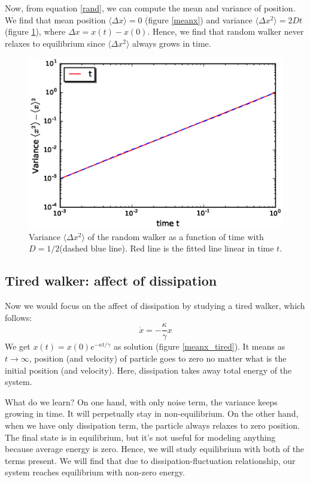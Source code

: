 \documentclass[11pt,a4paper]{article}
\begin{document}
Now, from equation \ref{rand}, we can compute the mean and variance of position. We find that mean position $\langle \Delta x\rangle=0$ (figure \ref{meanx}) and variance $\langle \Delta x ^2\rangle=2 Dt$ (figure \ref{varx}), where $\Delta x= x(t)-x(0)$. Hence, we find that random walker never relaxes to equilibrium since  $\langle \Delta x ^2\rangle$ always grows in time. 




\begin{figure}[!htbp]
\centering
\includegraphics[scale=0.67]{x_var.eps}
\caption{ Variance $\langle \Delta x ^2\rangle$ of the random walker as a function of time with $D=1/2$(dashed blue line).  Red line is the fitted line linear in time $t$.  }
\label{varx}
\end{figure}




\subsection*{Tired walker: affect of dissipation}
Now we would focus on the affect of dissipation by studying a tired walker, which follows:
\begin{equation}
\dot{x}= - \frac{\kappa}{\gamma} x 
\end{equation}
We get $x(t)=x(0) e^{-\kappa t/\gamma}$ as solution (figure \ref{meanx_tired}). It means as $t\rightarrow \infty$, position  (and velocity) of particle goes to zero no matter what is the initial position (and velocity). Here, dissipation takes away total energy of the system. 

What do we learn? On one hand, with only noise term, the variance keeps growing in time. It will perpetually stay in non-equilibrium. On the other hand, when we have only dissipation term, the particle always relaxes to zero position. The final state is in equilibrium, but it's not useful for modeling anything because average energy is zero. Hence, we will study equilibrium with both of the terms present. We will find that due to dissipation-fluctuation relationship, our system reaches equilibrium with non-zero energy.
\end{document}
